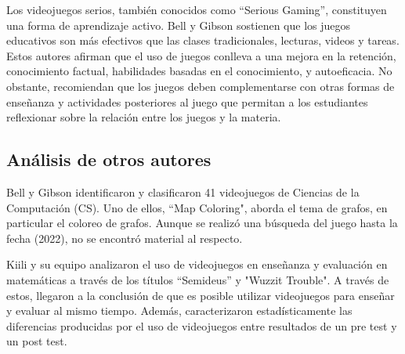 Los videojuegos serios, también conocidos como ``Serious Gaming'', constituyen una forma de aprendizaje activo. Bell y Gibson \cite{evaluation_of_games_for_teaching_cs} sostienen que los juegos educativos son más efectivos que las clases tradicionales, lecturas, videos y tareas. Estos autores afirman que el uso de juegos conlleva a una mejora en la retención, conocimiento factual, habilidades basadas en el conocimiento, y autoeficacia. No obstante, recomiendan que los juegos deben complementarse con otras formas de enseñanza y actividades posteriores al juego que permitan a los estudiantes reflexionar sobre la relación entre los juegos y la materia.

\subsection{Análisis de otros autores}

Bell y Gibson \cite{evaluation_of_games_for_teaching_cs} identificaron y clasificaron 41 videojuegos de Ciencias de la Computación (CS). Uno de ellos, ``Map Coloring", aborda el tema de grafos, en particular el coloreo de grafos. Aunque se realizó una búsqueda del juego hasta la fecha (2022), no se encontró material al respecto.

Kiili y su equipo \cite{using_videogames_maths} analizaron el uso de videojuegos en enseñanza y evaluación en matemáticas a través de los títulos ``Semideus'' y "Wuzzit Trouble". A través de estos, llegaron a la conclusión de que es posible utilizar videojuegos para enseñar y evaluar al mismo tiempo. Además, caracterizaron estadísticamente las diferencias producidas por el uso de videojuegos entre resultados de un pre test y un post test.


